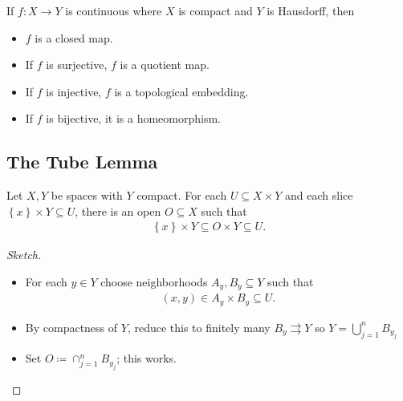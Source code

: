 \begin{theorem}

If \(f:X\to Y\) is continuous where \(X\) is compact and \(Y\) is
Hausdorff, then

\begin{itemize}
\tightlist
\item
  \(f\) is a closed map.
\item
  If \(f\) is surjective, \(f\) is a quotient map.
\item
  If \(f\) is injective, \(f\) is a topological embedding.
\item
  If \(f\) is bijective, it is a homeomorphism.
\end{itemize}

\end{theorem}

\hypertarget{the-tube-lemma}{%
\subsection{The Tube Lemma}\label{the-tube-lemma}}

\begin{theorem}

Let \(X, Y\) be spaces with \(Y\) compact. For each
\(U \subseteq X \times Y\) and each slice
\(\left\{{x}\right\} \times Y \subseteq U\), there is an open
\(O \subseteq X\) such that
\begin{align*}
\left\{{x}\right\} \times Y \subseteq O \times Y \subseteq U
.\end{align*}

\end{theorem}

\begin{proof}[Sketch]

\envlist

\begin{itemize}
\tightlist
\item
  For each \(y\in Y\) choose neighborhoods \(A_y, B_y \subseteq Y\) such
  that
  \begin{align*}
  (x, y) \in A_y \times B_y \subseteq U
  .\end{align*}
\item
  By compactness of \(Y\), reduce this to finitely many
  \(B_y \rightrightarrows Y\) so \(Y = \bigcup_{j=1}^n B_{y_j}\)
\item
  Set \(O\coloneqq\cap_{j=1}^n B_{y_j}\); this works.
\end{itemize}

\end{proof}

